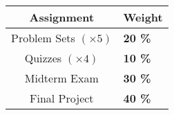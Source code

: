 \begin{table}[ht]
    \centering
    \begin{tabular}{c|l}
    \textbf{Assignment} & \textbf{Weight} \\
    \toprule
    Problem Sets $(\times 5)$  & \textbf{20 \%} \\
    Quizzes $(\times 4)$ & \textbf{10 \%} \\
    Midterm Exam  & \textbf{30 \%} \\
    Final Project  & \textbf{40 \%} \\
    \bottomrule
    \end{tabular}
    \label{Grade-Dist}
\end{table}